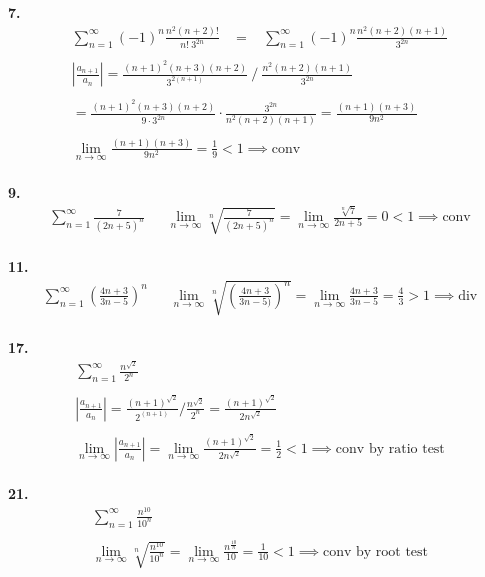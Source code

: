 \documentclass{article}
\begin{document}
\noindent
\textbf{7.}
\begin{gather*}
\sum_{n=1}^{\infty} (-1)^n \frac{n^2(n+2)!}{n!~3^{2n}}
~~~~=~~~~\sum_{n=1}^{\infty} (-1)^n \frac{n^2(n+2)(n+1)}{3^{2n}}
\\
\\
\left|
\frac{a_{n+1}}{a_n}
\right|
=\frac{(n+1)^2(n+3)(n+2)}{3^{2(n+1)}} ~/~ \frac{n^2(n+2)(n+1)}{3^{2n}}
\\
\\
=\frac{(n+1)^2(n+3)(n+2)}{9 \cdot 3^{2n}} \cdot \frac{3^{2n}}{n^2(n+2)(n+1)}
=\frac{(n+1)(n+3)}{9n^2}
\\
\\
\lim_{n \to \infty} \frac{(n+1)(n+3)}{9n^2}
=\frac{1}{9} < 1 \implies \text{conv}
\end{gather*}
\hfill
\\



\noindent
\textbf{9.}
\begin{gather*}
\sum_{n=1}^{\infty} \frac{7}{(2n+5)^n}
~~~~~~~
\lim_{n \to \infty} \sqrt[n]{\frac{7}{(2n+5)^n}}
=\lim_{n \to \infty} \frac{\sqrt[n]{7}}{2n+5} = 0 < 1 \implies \text{conv}
\end{gather*}
\hfill
\\



\noindent
\textbf{11.}
\begin{gather*}
\sum_{n=1}^{\infty} \left( \frac{4n+3}{3n-5} \right)^n
~~~~~~~
\lim_{n \to \infty} \sqrt[n]{ \left( \frac{4n+3}{3n-5)} \right)^n}
=\lim_{n \to \infty} \frac{4n+3}{3n-5} = \frac{4}{3} > 1 \implies \text{div}
\end{gather*}
\hfill
\\



\noindent
\textbf{17.}
\begin{gather*}
\sum_{n=1}^{\infty} \frac{n^{\sqrt{2}}}{2^n}
\\
\\
\left|
\frac{a_{n+1}}{a_n}
\right|
=\frac{(n+1)^{\sqrt{2}}}{2^{(n+1)}} / \frac{n^{\sqrt{2}}}{2^n}
=\frac{(n+1)^{\sqrt{2}}}{2n^{\sqrt{2}}}
\\
\\
\lim_{n \to \infty} 
\left|
\frac{a_{n+1}}{a_n}
\right|
=
\lim_{n \to \infty} 
\frac{(n+1)^{\sqrt{2}}}{2n^{\sqrt{2}}}=\frac{1}{2}<1 \implies \text{conv by ratio test}
\end{gather*}
\hfill
\\

\noindent
\textbf{21.}
\begin{gather*}
\sum_{n=1}^{\infty} \frac{n^{10}}{10^n}
\\
\\
\lim_{n \to \infty} \sqrt[n]{\frac{n^{10}}{10^n}}=\lim_{n \to \infty} \frac{n^{\frac{10}{n}}}{10}
=\frac{1}{10}<1 \implies \text{conv by root test}
\end{gather*}
\hfill
\\
\end{document}
